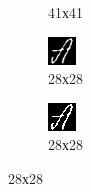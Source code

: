 \begin{figure}[ht]
\begin{subfigure}{0.24\textwidth}
		\caption{41х41}
		\label{fig:letter_a_cropped}
	\end{subfigure}
	\begin{subfigure}{0.24\textwidth}
		\centering
		\includegraphics[width=0.9\linewidth]{images/letter_a_resized}
		\caption{28х28}
		\label{fig:letter_a_resized}
	\end{subfigure}
	\begin{subfigure}{0.24\textwidth}
		\centering
		\includegraphics[width=0.9\linewidth]{images/letter_a_final}
		\caption{28х28}
		\label{fig:letter_a_final}
	\end{subfigure}


\end{figure}
